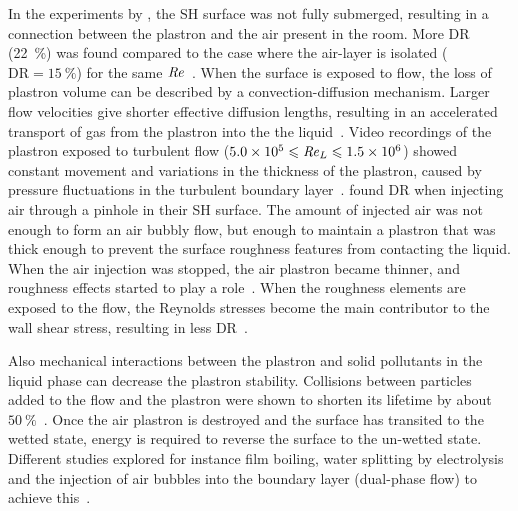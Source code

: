 In the experiments by \cite{Srinivasan2015}, the SH surface was not fully submerged, resulting in a connection between the plastron and the air present in the room. More DR (\SI{22}{\percent}) was found compared to the case where the air-layer is isolated ($\text{DR} = \SI{15}{\percent}$) for the same $\mbox{\textit{Re}}$~\citep{Srinivasan2015}. When the surface is exposed to flow, the loss of plastron volume can be described by a convection-diffusion mechanism. Larger flow velocities give shorter effective diffusion lengths, resulting in an accelerated transport of gas from the plastron into the the liquid~\citep{Xiang2016}. Video recordings of the plastron exposed to turbulent flow ($5.0 \times 10^{5} \leqslant \mbox{\textit{Re}}_L \leqslant 1.5\times 10^{6}$) showed constant movement and variations in the thickness of the plastron, caused by pressure fluctuations in the turbulent boundary layer~\citep{Reholon2018}. \cite{Du2017} found DR when injecting air through a pinhole in their SH surface. The amount of injected air was not enough to form an air bubbly flow, but enough to maintain a plastron that was thick enough to prevent the surface roughness features from contacting the liquid. When the air injection was stopped, the air plastron became thinner, and roughness effects started to play a role~\citep{Du2017}. When the roughness elements are exposed to the flow, the Reynolds stresses become the main contributor to the wall shear stress, resulting in less DR~\citep{Ling2016}.

 Also mechanical interactions between the plastron and solid pollutants in the liquid phase can decrease the plastron stability. Collisions between particles added to the flow and the plastron were shown to shorten its lifetime by about $\SI{50}{\%}$~\citep{Hokmabad2017}. Once the air plastron is destroyed and the surface has transited to the wetted state, energy is required to reverse the surface to the un-wetted state. Different studies explored for instance film boiling, water splitting by electrolysis and the injection of air bubbles into the boundary layer (dual-phase flow) to achieve this~\citep{Saranadhi2016,Panchanathan2018}.


